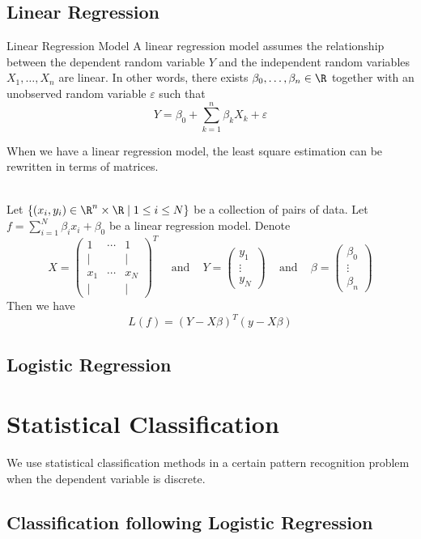 \documentclass[a4paper]{article}
\begin{document}
\subsection{Linear Regression}
\begin{defn}{Linear Regression Model}{} A linear regression model assumes the relationship between the dependent random variable $Y$ and the independent random variables $X_1,\dots,X_n$ are linear. In other words, there exists $\beta_0,\dots,\beta_n\in\R$ together with an unobserved random variable $\varepsilon$ such that $$Y=\beta_0+\sum_{k=1}^n\beta_kX_k+\varepsilon$$
\end{defn}

When we have a linear regression model, the least square estimation can be rewritten in terms of matrices. 

\begin{lmm}{}{}\\
Let $\{(x_i,y_i)\in\R^n\times\R\;|\;1\leq i\leq N\}$ be a collection of pairs of data. Let $f=\sum_{i=1}^N\beta_ix_i+\beta_0$ be a linear regression model. Denote $$X=\begin{pmatrix}
1 & \cdots & 1\\
\mid & & \mid\\
x_1 & \cdots & x_N\\
\mid & & \mid
\end{pmatrix}^T\;\;\;\text{ and }\;\;\;Y=\begin{pmatrix}
y_1 \\ \vdots \\ y_N
\end{pmatrix}\;\;\;\text{ and }\;\;\;\beta=\begin{pmatrix}
\beta_0 \\ \vdots \\ \beta_n
\end{pmatrix}$$
Then we have $$L(f)=(Y-X\beta)^T(y-X\beta)$$
\end{lmm}

\subsection{Logistic Regression}

\pagebreak
\section{Statistical Classification}
We use statistical classification methods in a certain pattern recognition problem when the dependent variable is discrete. 

\subsection{Classification following Logistic Regression}
\end{document}
